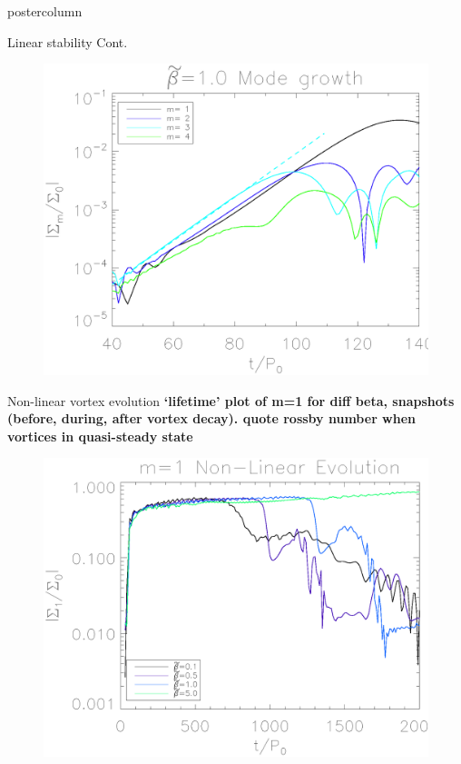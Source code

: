 \documentclass[final,hyperref={pdfpagelabels=false}]{beamer}
\begin{document}
\begin{frame}
\begin{columns}
\begin{column}{.49\textwidth}
\begin{beamercolorbox}[center,wd=\textwidth]{postercolumn}
\begin{minipage}[T]{.95\textwidth}
{            \begin{block}{\Large{Linear stability Cont.}}
              \justifying
              \begin{figure}
                \centering
                \includegraphics[width=\textwidth]{Posterfig_Growth}
              \end{figure}
            \end{block}

            \vfill

            \begin{block}{\Large{Non-linear vortex evolution}}
              \justifying
                  {\bf `lifetime' plot of m=1 for diff beta, snapshots
                    (before, during, after vortex decay). quote rossby
                  number when vortices in quasi-steady state}

                  \begin{figure}
                    \centering
                    \includegraphics[width=\textwidth]{Posterfig_Lifetime_b}
                  \end{figure}


\end{block}}
\end{minipage}
\end{beamercolorbox}
\end{column}
\end{columns}
\end{frame}
\end{document}
